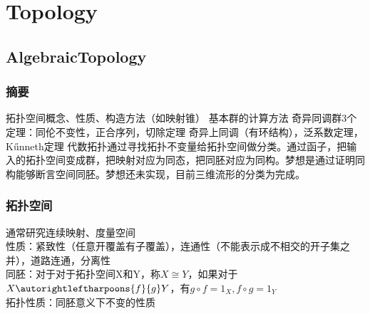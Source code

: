 
\chapter{Topology}

\section{AlgebraicTopology}
\subsection{摘要}
拓扑空间概念、性质、构造方法（如映射锥）
基本群的计算方法
奇异同调群3个定理：同伦不变性，正合序列，切除定理
奇异上同调（有环结构），泛系数定理，K\H unneth定理
代数拓扑通过寻找拓扑不变量给拓扑空间做分类。通过函子，把输入的拓扑空间变成群，把映射对应为同态，把同胚对应为同构。梦想是通过证明同构能够断言空间同胚。梦想还未实现，目前三维流形的分类为完成。
\subsection{拓扑空间}
通常研究连续映射、度量空间\\
性质：紧致性（任意开覆盖有子覆盖），连通性（不能表示成不相交的开子集之并），道路连通，分离性\\
同胚：对于对于拓扑空间X和Y，称$X\cong Y$，如果对于$ X \autorightleftharpoons{f}{g}Y $，有$ g\circ f =1_X,f\circ g=1_Y $\\
拓扑性质：同胚意义下不变的性质















 
\begin{comment}
    dsa 
    X \autorightleftharpoons{d969696}{3}Y
    \overset{f}{ \underset{g}{\rightleftharpoons} } 
    \xlongequal[d]{dfafdsf}
    \autorightleftharpoons{f}{g} Z

    \begin{equation}
    \label{homeomorphism}
    \begin{split}
        &\text{if: }X \autorightleftharpoons{f}{g}Y\\
        &\text{where: }g\circ f =1_X,f\circ g=1_Y\\
        &\text{then: }X\cong Y\\
    \end{split}
    \end{equation}

\end{comment}

